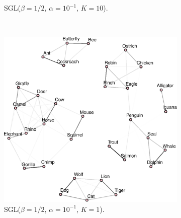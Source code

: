 \begin{figure}[!htb]
\begin{subfigure}[b]{0.475\textwidth}
      \caption{\textsf{SGL}($\beta = 1/2$, $\alpha = 10^{-1}$, $K = 10$).}
    \end{subfigure}\\
    \begin{subfigure}[b]{0.475\textwidth}
      \includegraphics[width=\textwidth]{animals/graphs_for_different_k/animals_graph_k1.eps}
      \caption{\textsf{SGL}($\beta = 1/2$, $\alpha = 10^{-1}$, $K = 1$).}
    \end{subfigure}
    ~
    \begin{subfigure}[b]{0.475\textwidth}

\end{subfigure}
\end{figure}
